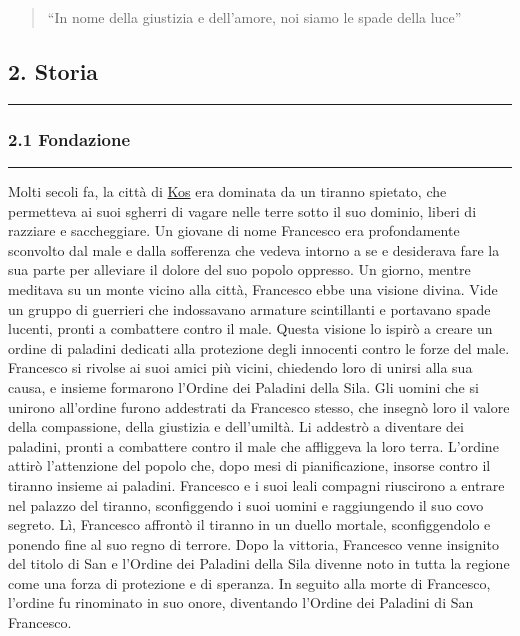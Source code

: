 \begin{quote}
``In nome della giustizia e dell'amore, noi siamo le spade della luce''
\end{quote}

\subsection{2. Storia}\label{storia}

\begin{center}\rule{0.5\linewidth}{0.5pt}\end{center}

\subsubsection{2.1 Fondazione}\label{fondazione}

\begin{center}\rule{0.5\linewidth}{0.5pt}\end{center}

Molti secoli fa, la città di
\href{Kos\%20bb2884f1df2e4e47890b8cefddb5e4bd.md}{Kos} era dominata da
un tiranno spietato, che permetteva ai suoi sgherri di vagare nelle
terre sotto il suo dominio, liberi di razziare e saccheggiare. Un
giovane di nome Francesco era profondamente sconvolto dal male e dalla
sofferenza che vedeva intorno a se e desiderava fare la sua parte per
alleviare il dolore del suo popolo oppresso. Un giorno, mentre meditava
su un monte vicino alla città, Francesco ebbe una visione divina. Vide
un gruppo di guerrieri che indossavano armature scintillanti e portavano
spade lucenti, pronti a combattere contro il male. Questa visione lo
ispirò a creare un ordine di paladini dedicati alla protezione degli
innocenti contro le forze del male. Francesco si rivolse ai suoi amici
più vicini, chiedendo loro di unirsi alla sua causa, e insieme formarono
l'Ordine dei Paladini della Sila. Gli uomini che si unirono all'ordine
furono addestrati da Francesco stesso, che insegnò loro il valore della
compassione, della giustizia e dell'umiltà. Li addestrò a diventare dei
paladini, pronti a combattere contro il male che affliggeva la loro
terra. L'ordine attirò l'attenzione del popolo che, dopo mesi di
pianificazione, insorse contro il tiranno insieme ai paladini. Francesco
e i suoi leali compagni riuscirono a entrare nel palazzo del tiranno,
sconfiggendo i suoi uomini e raggiungendo il suo covo segreto. Lì,
Francesco affrontò il tiranno in un duello mortale, sconfiggendolo e
ponendo fine al suo regno di terrore. Dopo la vittoria, Francesco venne
insignito del titolo di San e l'Ordine dei Paladini della Sila divenne
noto in tutta la regione come una forza di protezione e di speranza. In
seguito alla morte di Francesco, l'ordine fu rinominato in suo onore,
diventando l'Ordine dei Paladini di San Francesco.


